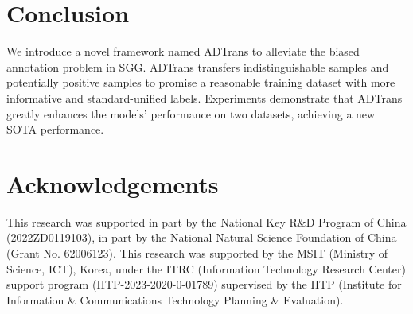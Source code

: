 \documentclass[letterpaper]{article} %
\begin{document}



\section{Conclusion}

We introduce a novel framework named ADTrans to alleviate the biased annotation problem in SGG. ADTrans transfers indistinguishable samples and potentially positive samples to promise a reasonable training dataset with more informative and standard-unified labels. Experiments demonstrate that ADTrans greatly enhances the models' performance on two datasets, achieving a new SOTA performance.

\section{Acknowledgements}
This research was supported in part by the National Key R\&D Program of China (2022ZD0119103), in part by the National Natural Science Foundation of China (Grant No. 62006123).
This research was supported by the MSIT (Ministry of Science, ICT), Korea,
under the ITRC (Information Technology Research Center) support program
(IITP-2023-2020-0-01789) supervised by the IITP (Institute for Information \&
Communications Technology Planning \& Evaluation).

\end{document}
